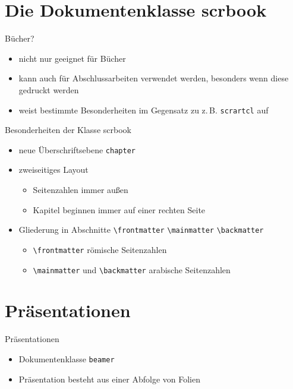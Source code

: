 \documentclass[presentation,aspectratio=169]{beamer}
\begin{document}
\section{Die Dokumentenklasse scrbook}

\begin{frame}[fragile]{Bücher?}
  \begin{itemize}
    \item nicht nur geeignet für Bücher
    \item kann auch für Abschlussarbeiten verwendet werden, besonders wenn diese gedruckt werden
    \item weist bestimmte Besonderheiten im Gegensatz zu z.\,B. \verb|scrartcl| auf
  \end{itemize}
\end{frame}

\begin{frame}[fragile]{Besonderheiten der Klasse scrbook}
  \begin{itemize}
    \item neue Überschriftsebene \verb|chapter|
    \item zweiseitiges Layout
      \begin{itemize}
        \item Seitenzahlen immer außen
        \item Kapitel beginnen immer auf einer rechten Seite
      \end{itemize}
    \item Gliederung in Abschnitte \verb|\frontmatter| \verb|\mainmatter| \verb|\backmatter|
      \begin{itemize}
        \item \verb|\frontmatter| römische Seitenzahlen
        \item \verb|\mainmatter| und \verb|\backmatter| arabische Seitenzahlen
      \end{itemize}
  \end{itemize}
\end{frame}

\section{Präsentationen}

\begin{frame}[fragile]{Präsentationen}
  \begin{itemize}
    \item Dokumentenklasse \verb|beamer|
    \item Präsentation besteht aus einer Abfolge von Folien
      \inputminted{latex}{codebeispiele/beamer-frame.tex}
  \end{itemize}
\end{frame}
\end{document}
